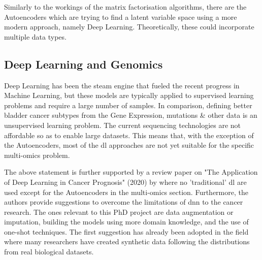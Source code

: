 Similarly to the workings of the matrix factorisation algorithms, there are the Autoencoders which are trying to find a latent variable space using a more modern approach, namely Deep Learning. Theoretically, these could incorporate multiple data types.

\subsection{Deep Learning  and Genomics} \label{s:lit:dl_genomics}

\vspace{3mm}
\vspace{3mm}

Deep Learning has been the steam engine that fueled the recent progress in Machine Learning, but these models are typically applied to supervised learning problems and require a large number of samples. In comparison, defining better bladder cancer subtypes from the Gene Expression, mutations \& other data is an unsupervised learning problem. The current sequencing technologies are not affordable so as to enable large datasets. This means that, with the exception of the Autoencoders, most of the \acrshort{dl} approaches are not yet suitable for the specific multi-omics problem.

The above statement is further supported by a review paper on "The Application of Deep Learning in Cancer Prognosis" (2020) by \citet{Zhu2020-cv} where no 'traditional' \acrshort{dl} are used except for the Autoencoders in the multi-omics section. Furthermore, the authors provide suggestions to overcome the limitations of \acrshort{dnn} to the cancer research. The ones relevant to this PhD project are data augmentation or imputation, building the models using more domain knowledge, and the use of one-shot techniques. The first suggestion has already been adopted in the field where many researchers have created synthetic data \cite{Zhao2012-wj,Leiserson2015-yk} following the distributions from real biological datasets.

